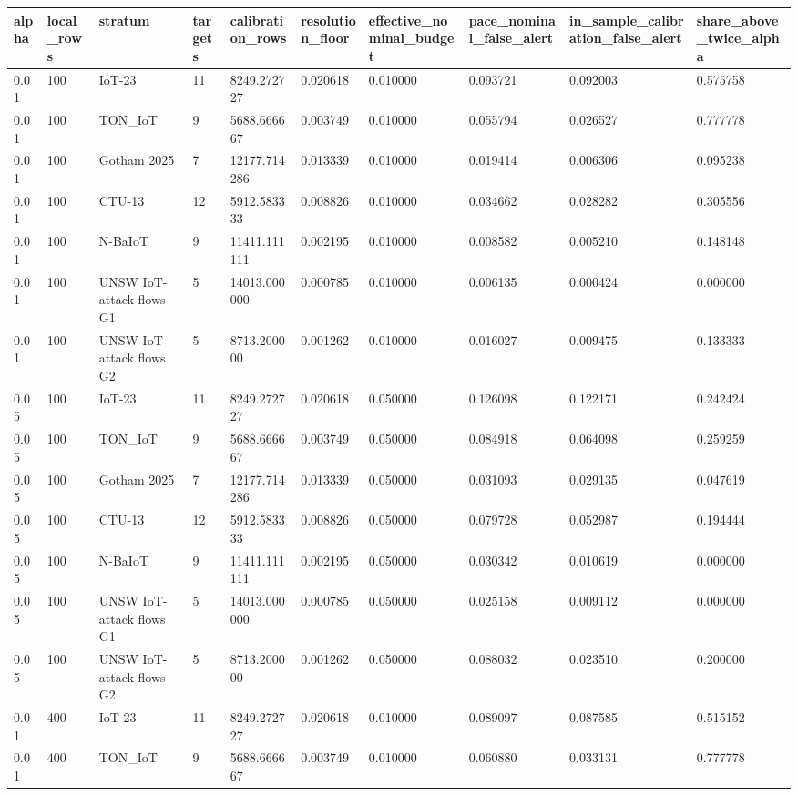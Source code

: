 \begin{tabular}{llllllllll}
\toprule
alpha & local\_rows & stratum & targets & calibration\_rows & resolution\_floor & effective\_nominal\_budget & pace\_nominal\_false\_alert & in\_sample\_calibration\_false\_alert & share\_above\_twice\_alpha \\
\midrule
0.01 & 100 & IoT-23 & 11 & 8249.272727 & 0.020618 & 0.010000 & 0.093721 & 0.092003 & 0.575758 \\
0.01 & 100 & TON\_IoT & 9 & 5688.666667 & 0.003749 & 0.010000 & 0.055794 & 0.026527 & 0.777778 \\
0.01 & 100 & Gotham 2025 & 7 & 12177.714286 & 0.013339 & 0.010000 & 0.019414 & 0.006306 & 0.095238 \\
0.01 & 100 & CTU-13 & 12 & 5912.583333 & 0.008826 & 0.010000 & 0.034662 & 0.028282 & 0.305556 \\
0.01 & 100 & N-BaIoT & 9 & 11411.111111 & 0.002195 & 0.010000 & 0.008582 & 0.005210 & 0.148148 \\
0.01 & 100 & UNSW IoT-attack flows G1 & 5 & 14013.000000 & 0.000785 & 0.010000 & 0.006135 & 0.000424 & 0.000000 \\
0.01 & 100 & UNSW IoT-attack flows G2 & 5 & 8713.200000 & 0.001262 & 0.010000 & 0.016027 & 0.009475 & 0.133333 \\
0.05 & 100 & IoT-23 & 11 & 8249.272727 & 0.020618 & 0.050000 & 0.126098 & 0.122171 & 0.242424 \\
0.05 & 100 & TON\_IoT & 9 & 5688.666667 & 0.003749 & 0.050000 & 0.084918 & 0.064098 & 0.259259 \\
0.05 & 100 & Gotham 2025 & 7 & 12177.714286 & 0.013339 & 0.050000 & 0.031093 & 0.029135 & 0.047619 \\
0.05 & 100 & CTU-13 & 12 & 5912.583333 & 0.008826 & 0.050000 & 0.079728 & 0.052987 & 0.194444 \\
0.05 & 100 & N-BaIoT & 9 & 11411.111111 & 0.002195 & 0.050000 & 0.030342 & 0.010619 & 0.000000 \\
0.05 & 100 & UNSW IoT-attack flows G1 & 5 & 14013.000000 & 0.000785 & 0.050000 & 0.025158 & 0.009112 & 0.000000 \\
0.05 & 100 & UNSW IoT-attack flows G2 & 5 & 8713.200000 & 0.001262 & 0.050000 & 0.088032 & 0.023510 & 0.200000 \\
0.01 & 400 & IoT-23 & 11 & 8249.272727 & 0.020618 & 0.010000 & 0.089097 & 0.087585 & 0.515152 \\
0.01 & 400 & TON\_IoT & 9 & 5688.666667 & 0.003749 & 0.010000 & 0.060880 & 0.033131 & 0.777778 \\

\end{tabular}
